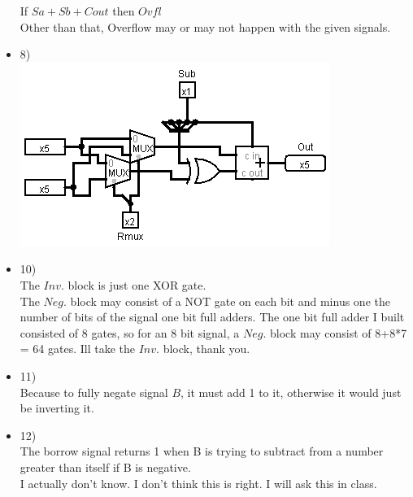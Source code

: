 \documentclass{article}
\begin{document}
\begin{itemize}
    If $Sa+Sb+Cout$ then $Ovfl$\\
    Other than that, Overflow may or may not happen with the given signals.
  \item
    8)\\
    \includegraphics[scale=0.5]{ass4-8.png}
  \item
    10)\\
    The $Inv.$ block is just one XOR gate.\\
    The $Neg.$ block may consist of a NOT gate on each bit and minus one the number of bits of the signal one bit full adders. The one bit full adder I built consisted of 8 gates, so for an 8 bit signal, a $Neg.$ block may consist of 8+8*7 = 64 gates. Ill take the $Inv.$ block, thank you.
  \item
    11)\\
    Because to fully negate signal $B$, it must add 1 to it, otherwise it would just be inverting it.
    \item
    12)\\
    The borrow signal returns 1 when B is trying to subtract from a number greater than itself if B is negative.\\
    I actually don't know. I don't think this is right. I will ask this in class.
\end{itemize}
\end{document}
